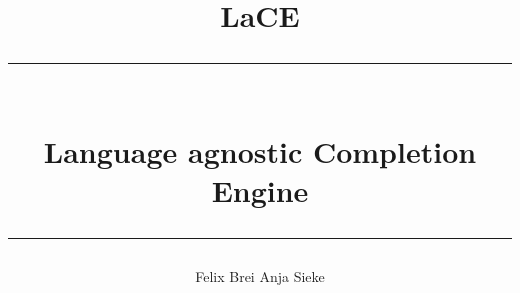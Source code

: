 \title{\huge LaCE \\ \rule{\linewidth}{0.5pt} \\[0.5cm] Language agnostic Completion Engine \rule{\linewidth}{1pt}}

\author{Felix Brei \hspace{3cm} Anja Sieke}
